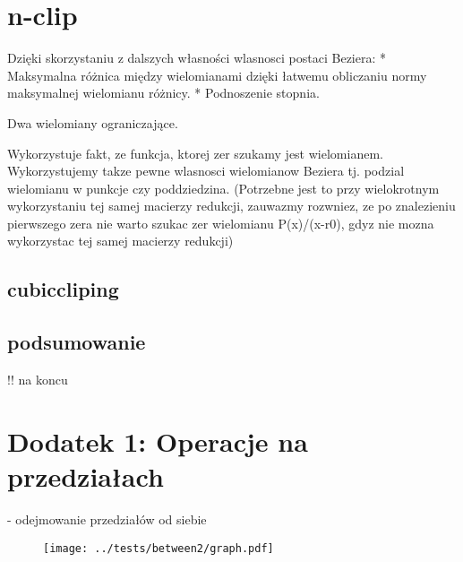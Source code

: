 \documentclass[11pt,a4paper,oneside]{report}
\begin{document}
\section{n-clip}

Dzięki skorzystaniu z dalszych własności wlasnosci postaci Beziera: 
* Maksymalna różnica między wielomianami dzięki łatwemu obliczaniu normy maksymalnej wielomianu różnicy.
* Podnoszenie stopnia.

Dwa wielomiany ograniczające.

Wykorzystuje fakt, ze funkcja, ktorej zer szukamy jest wielomianem. Wykorzystujemy takze pewne wlasnosci wielomianow Beziera tj. podzial wielomianu w punkcje czy poddziedzina. (Potrzebne jest to przy wielokrotnym wykorzystaniu tej samej macierzy redukcji, zauwazmy rozwniez, ze po znalezieniu pierwszego zera nie warto szukac zer wielomianu P(x)/(x-r0), gdyz nie mozna wykorzystac tej samej macierzy redukcji)

\subsection{cubiccliping}

\subsection{podsumowanie}

!! na koncu

\section{Dodatek 1: Operacje na przedziałach}

- odejmowanie przedziałów od siebie



\begin{center}
\begin{figure}
\texttt{[image: ../tests/between2/graph.pdf]}
\end{figure}
\end{center}
\end{document}
